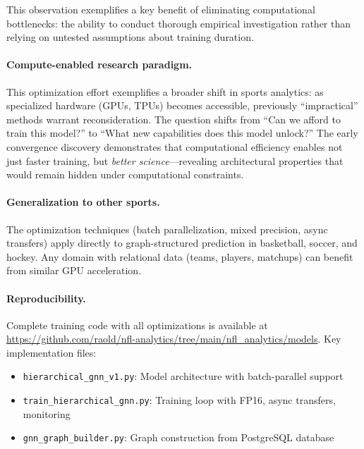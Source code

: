 This observation exemplifies a key benefit of eliminating computational bottlenecks: the ability to conduct thorough empirical investigation rather than relying on untested assumptions about training duration.

\paragraph{Compute-enabled research paradigm.} This optimization effort exemplifies a broader shift in sports analytics: as specialized hardware (GPUs, TPUs) becomes accessible, previously ``impractical'' methods warrant reconsideration. The question shifts from ``Can we afford to train this model?'' to ``What new capabilities does this model unlock?'' The early convergence discovery demonstrates that computational efficiency enables not just faster training, but \textit{better science}—revealing architectural properties that would remain hidden under computational constraints.

\paragraph{Generalization to other sports.} The optimization techniques (batch parallelization, mixed precision, async transfers) apply directly to graph-structured prediction in basketball, soccer, and hockey. Any domain with relational data (teams, players, matchups) can benefit from similar GPU acceleration.

\paragraph{Reproducibility.} Complete training code with all optimizations is available at \url{https://github.com/raold/nfl-analytics/tree/main/nfl_analytics/models}. Key implementation files:
\begin{itemize}
    \item \texttt{hierarchical\_gnn\_v1.py}: Model architecture with batch-parallel support
    \item \texttt{train\_hierarchical\_gnn.py}: Training loop with FP16, async transfers, monitoring
    \item \texttt{gnn\_graph\_builder.py}: Graph construction from PostgreSQL database
\end{itemize}


